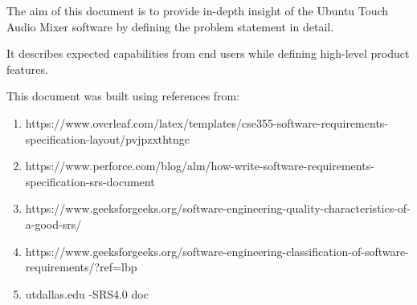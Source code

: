 \label{ch:intro}
The aim of this document is to provide in-depth insight of the Ubuntu Touch Audio Mixer software by defining the problem statement in detail. 

It describes expected capabilities from end users while defining high-level product features.


This document was built using references from:


\begin{enumerate}
\item https://www.overleaf.com/latex/templates/cse355-software-requirements-specification-layout/pvjpzxthtngc
\item https://www.perforce.com/blog/alm/how-write-software-requirements-specification-srs-document
\item https://www.geeksforgeeks.org/software-engineering-quality-characteristics-of-a-good-srs/
\item https://www.geeksforgeeks.org/software-engineering-classification-of-software-requirements/?ref=lbp
\item utdallas.edu -SRS4.0 doc
\end{enumerate}